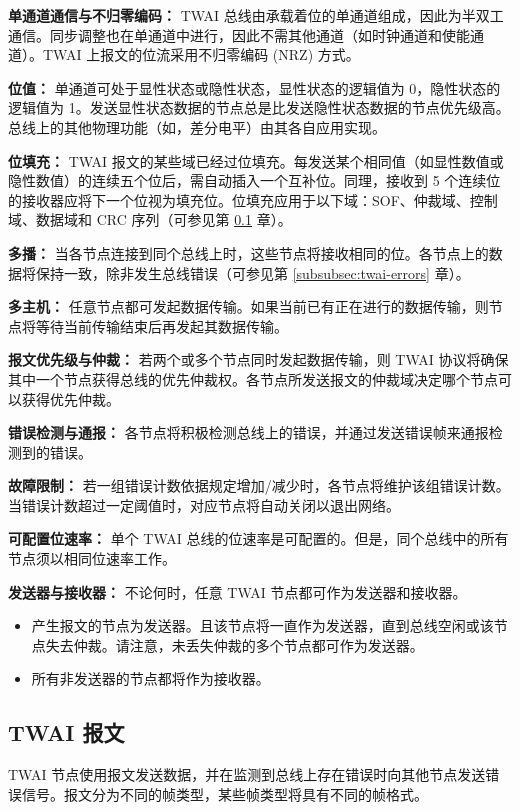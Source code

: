 \documentclass[main\_\_CN.tex]{subfiles}
\begin{document}
{\bfseries 单通道通信与不归零编码：} TWAI 总线由承载着位的单通道组成，因此为半双工通信。同步调整也在单通道中进行，因此不需其他通道（如时钟通道和使能通道）。TWAI 上报文的位流采用不归零编码 (NRZ) 方式。

{\bfseries 位值：} 单通道可处于显性状态或隐性状态，显性状态的逻辑值为 0，隐性状态的逻辑值为 1。发送显性状态数据的节点总是比发送隐性状态数据的节点优先级高。总线上的其他物理功能（如，差分电平）由其各自应用实现。

{\bfseries 位填充：} TWAI 报文的某些域已经过位填充。每发送某个相同值（如显性数值或隐性数值）的连续五个位后，需自动插入一个互补位。同理，接收到 5 个连续位的接收器应将下一个位视为填充位。位填充应用于以下域：SOF、仲裁域、控制域、数据域和 CRC 序列（可参见第 \ref{subsubsec:twai-messages} 章）。

{\bfseries 多播：} 当各节点连接到同个总线上时，这些节点将接收相同的位。各节点上的数据将保持一致，除非发生总线错误（可参见第 \ref{subsubsec:twai-errors} 章）。

{\bfseries 多主机：} 任意节点都可发起数据传输。如果当前已有正在进行的数据传输，则节点将等待当前传输结束后再发起其数据传输。

{\bfseries 报文优先级与仲裁：} 若两个或多个节点同时发起数据传输，则 TWAI 协议将确保其中一个节点获得总线的优先仲裁权。各节点所发送报文的仲裁域决定哪个节点可以获得优先仲裁。

{\bfseries 错误检测与通报：} 各节点将积极检测总线上的错误，并通过发送错误帧来通报检测到的错误。

{\bfseries 故障限制：} 若一组错误计数依据规定增加/减少时，各节点将维护该组错误计数。当错误计数超过一定阈值时，对应节点将自动关闭以退出网络。

{\bfseries 可配置位速率：} 单个 TWAI 总线的位速率是可配置的。但是，同个总线中的所有节点须以相同位速率工作。

{\bfseries 发送器与接收器：} 不论何时，任意 TWAI 节点都可作为发送器和接收器。
\begin{itemize}
    \item 产生报文的节点为发送器。且该节点将一直作为发送器，直到总线空闲或该节点失去仲裁。请注意，未丢失仲裁的多个节点都可作为发送器。
    \item 所有非发送器的节点都将作为接收器。
\end{itemize}

\subsection{TWAI 报文}
\label{subsubsec:twai-messages}
TWAI 节点使用报文发送数据，并在监测到总线上存在错误时向其他节点发送错误信号。报文分为不同的帧类型，某些帧类型将具有不同的帧格式。
\end{document}
